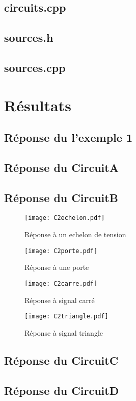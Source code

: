 \documentclass[a4paper,11pt]{article}
\begin{document}
  \subsection{circuits.cpp}
    
    \newpage
   \subsection{sources.h}
    
    \newpage
   \subsection{sources.cpp}
    
    \newpage

\section{Résultats}
  \subsection{Réponse du l'exemple 1}
  \subsection{Réponse du CircuitA}
  \subsection{Réponse du CircuitB}
 
      \begin{figure}[H]
	 \begin{center}
	\texttt{[image: C2echelon.pdf]}
	\caption{Réponse à un echelon de tension}
	\end{center}
      \end{figure}
      
      \begin{figure}[H]
	      \begin{center}
		\texttt{[image: C2porte.pdf]}
		\caption{Réponse à une porte}
	      \end{center}
	    \end{figure}

      \begin{figure}[H]
	      \begin{center}
		\texttt{[image: C2carre.pdf]}
		\caption{Réponse à signal carré}
	      \end{center}
	    \end{figure}

      \begin{figure}[H]
	      \begin{center}
		 \texttt{[image: C2triangle.pdf]}%
		\caption{Réponse à signal triangle}
	      \end{center}
	    \end{figure}
    
  \subsection{Réponse du CircuitC}
  \subsection{Réponse du CircuitD}
\end{document}
